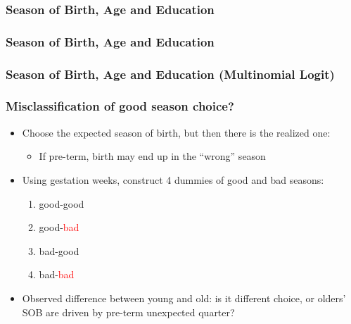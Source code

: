 \documentclass[10pt,letterpaper,subeqn]{beamer}
\begin{document}
\begin{frame}[label=NVSSseason]
\frametitle{Season of Birth, Age and Education}

\end{frame}

\begin{frame}[label=NVSSseasonQ]
\frametitle{Season of Birth, Age and Education}

\end{frame}

\begin{frame}[label=NVSSseasonQ]
\frametitle{Season of Birth, Age and Education (Multinomial Logit)}

\end{frame}


\begin{frame}[label=how]
\frametitle{Misclassification of good season choice?}
\begin{itemize}
\item Choose the expected season of birth, but then there is the realized one:
      \begin{itemize}
        \item If pre-term, birth may end up in the ``wrong'' season 
      \end{itemize}
\item Using gestation weeks, construct 4 dummies of good and bad seasons: 
\begin{enumerate}
\item good-\textcolor{cadmiumgreen}{good}
\item good-\textcolor{red}{bad}
\item bad-\textcolor{cadmiumgreen}{good}
\item bad-\textcolor{red}{bad}
\end{enumerate}
\item Observed difference between young and old: is it different choice, or 
olders' SOB are driven by pre-term unexpected quarter?
\end{itemize}

\end{frame}
\end{document}
